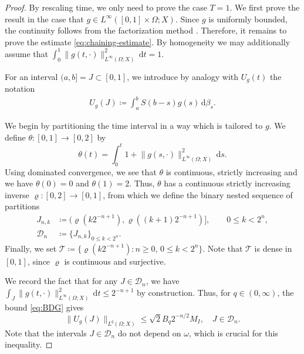 \documentclass[11pt]{amsart}
\theoremstyle{definition}
\theoremstyle{remark}
\numberwithin{equation}{section}
\newcommand{\1}{\mathbf 1}
\newcommand{\norm}[1]{\lVert #1\rVert}
\newcommand{\dd}{\,\mathrm d}
\begin{document}
\begin{proof}
By rescaling time, we only need to prove the case $T = 1$. We first prove  the result in the case that $g\in L^\infty([0,1]\times \Omega;X)$. 
Since $g$ is uniformly bounded, the continuity follows from the factorization method \cite{DaPratoKwapienZabczyk1987}. Therefore, it remains to prove the estimate \eqref{eq:chaining-estimate}.
By homogeneity  we may additionally assume that $\int_0^1 \|g(t,\cdot)\|_{L^\infty(\Omega;X)}^2 \dd t = 1$.

For an interval $(a,b] = J \subset [0,1]$, we introduce by analogy with $U_g(t)$ the notation
\begin{align*}
    U_g(J) \coloneq \int_a^b S(b-s)g(s) \dd \beta_s.
\end{align*}

We begin by partitioning the time interval in a way which is tailored to $g$.
We define $\theta \colon [0,1] \to [0,2]$ by
\begin{equation}
    \theta(t) =\int_0^t 1 + \norm{g(s,\cdot)}^2_{L^{\infty}(\Omega;X)} \dd s.
\end{equation}
Using dominated convergence, we see that $\theta$ is continuous, strictly increasing and we have $\theta(0) = 0$ and $\theta(1) = 2$.
Thus, $\theta$ has a continuous strictly increasing inverse $\varrho \colon [0,2] \to [0,1]$, from which we define the binary nested sequence of partitions
\begin{align*}
    J_{n,k} &\coloneq (\varrho(k 2^{-n+1}), \varrho((k+1)2^{-n+1})], \qquad 0 \leq k < 2^n, \\
    \mathcal{D}_n &\coloneq \{J_{n,k} \}_{0 \leq k < 2^n}.
\end{align*}
Finally, we set $\mathcal{T} \coloneq \{ \varrho(k 2^{-n+1}) : n \geq 0, \, 0 \leq k < 2^n \}$.
Note that $\mathcal{T}$ is dense in $[0,1]$, since $\varrho$ is continuous and surjective.

We record the fact that for any $J \in \mathcal{D}_n$, we have $\int_J \norm{g(t,\cdot)}_{L^{\infty}(\Omega;X)}^2 \dd t \leq 2^{-n+1}$ by construction.
Thus, for $q \in (0,\infty)$, the bound \eqref{eq:BDG} gives
\begin{equation}
    \label{eq:bdgchain}
    \norm{U_g(J)}_{L^q(\Omega;X)} \leq \sqrt{2} B_q 2^{-n/2}M_{I}, \quad J \in \mathcal{D}_n.
\end{equation}
Note that the intervals $J \in \mathcal{D}_n$ do not depend on $\omega$, which is crucial for this inequality.


\end{proof}
\end{document}
